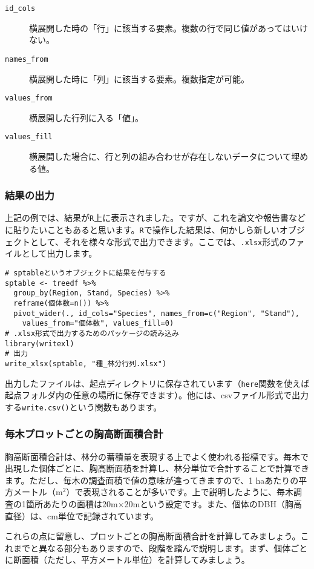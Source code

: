 \begin{description}
  \item[\texttt{id\_cols}]横展開した時の「行」に該当する要素。複数の行で同じ値があってはいけない。
  \item[\texttt{names\_from}]横展開した時に「列」に該当する要素。複数指定が可能。
  \item[\texttt{values\_from}]横展開した行列に入る「値」。
  \item[\texttt{values\_fill}]横展開した場合に、行と列の組み合わせが存在しないデータについて埋める値。
\end{description}

    \subsubsection{結果の出力}
上記の例では、結果が\texttt{R}上に表示されました。ですが、これを論文や報告書などに貼りたいこともあると思います。\texttt{R}で操作した結果は、何かしら新しいオブジェクトとして、それを様々な形式で出力できます。ここでは、\verb|.xlsx|形式のファイルとして出力します。

\begin{verbatim}
# sptableというオブジェクトに結果を付与する
sptable <- treedf %>%
  group_by(Region, Stand, Species) %>%
  reframe(個体数=n()) %>%
  pivot_wider(., id_cols="Species", names_from=c("Region", "Stand"),
    values_from="個体数", values_fill=0)
# .xlsx形式で出力するためのパッケージの読み込み
library(writexl)
# 出力
write_xlsx(sptable, "種_林分行列.xlsx")
\end{verbatim}

出力したファイルは、起点ディレクトリに保存されています（\verb|here|関数を使えば起点フォルダ内の任意の場所に保存できます）。他には、csvファイル形式で出力する\verb|write.csv()|という関数もあります。

    \subsubsection{毎木プロットごとの胸高断面積合計}
胸高断面積合計は、林分の蓄積量を表現する上でよく使われる指標です。毎木で出現した個体ごとに、胸高断面積を計算し、林分単位で合計することで計算できます。ただし、毎木の調査面積で値の意味が違ってきますので、1 haあたりの平方メートル（m$^{2}$）で表現されることが多いです。上で説明したように、毎木調査の1箇所あたりの面積は20m$\times$20mという設定です。また、個体のDBH（胸高直径）は、cm単位で記録されています。

これらの点に留意し、プロットごとの胸高断面積合計を計算してみましょう。これまでと異なる部分もありますので、段階を踏んで説明します。まず、個体ごとに断面積（ただし、平方メートル単位）を計算してみましょう。

